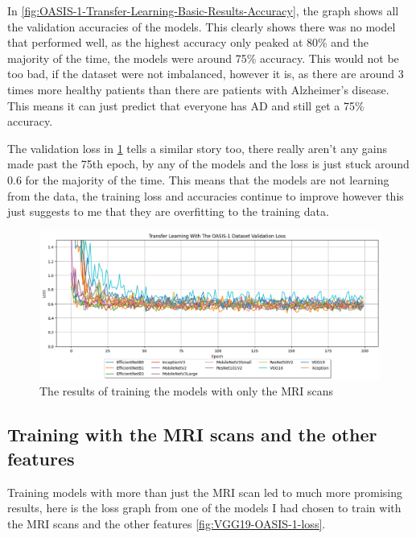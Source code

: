 \documentclass[]{final_report}
\begin{document}
In \ref{fig:OASIS-1-Transfer-Learning-Basic-Results-Accuracy}, the graph shows all the validation accuracies of the models. This clearly shows there was no model that performed well, as the highest accuracy only peaked at 80\% and the majority of the time, the models were around 75\% accuracy. This would not be too bad, if the dataset were not imbalanced, however it is, as there are around 3 times more healthy patients than there are patients with Alzheimer's disease. This means it can just predict that everyone has AD and still get a 75\% accuracy. 

The validation loss in \ref{fig:OASIS-1-Transfer-Learning-Basic-Results-Validation-Loss} tells a similar story too, there really aren't any gains made past the 75th epoch, by any of the models and the loss is just stuck around 0.6 for the majority of the time. This means that the models are not learning from the data, the training loss and accuracies continue to improve however this just suggests to me that they are overfitting to the training data.
 
\begin{figure}[ht!]
  \centering
  \includegraphics[width=1\textwidth]{images/OASIS-1-Transfer-Learning-Basic-Results-val-loss.png}
  \caption{The results of training the models with only the MRI scans}
  \label{fig:OASIS-1-Transfer-Learning-Basic-Results-Validation-Loss}
\end{figure}

\subsection{Training with the MRI scans and the other features}

Training models with more than just the MRI scan led to much more promising results, here is the loss graph from one of the models I had chosen to train with the MRI scans and the other features \ref{fig:VGG19-OASIS-1-loss}.
\end{document}
